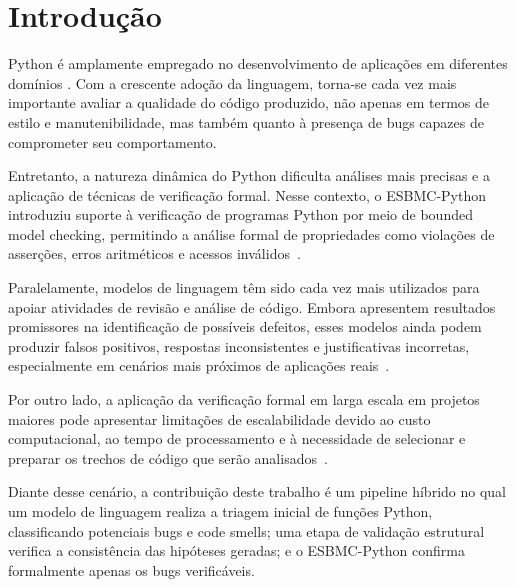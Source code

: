 \documentclass[sigconf]{acmart}
\begin{document}

\frenchspacing
\maketitle

\section{Introdução}

Python é amplamente empregado no desenvolvimento de aplicações em diferentes domínios \cite{tiobe2026}. Com a crescente adoção da linguagem, torna-se cada vez mais importante avaliar a qualidade do código produzido, não apenas em termos de estilo e manutenibilidade, mas também quanto à presença de bugs capazes de comprometer seu comportamento.

Entretanto, a natureza dinâmica do Python dificulta análises mais precisas e a aplicação de técnicas de verificação formal. Nesse contexto, o ESBMC-Python introduziu suporte à verificação de programas Python por meio de bounded model checking, permitindo a análise formal de propriedades como violações de asserções, erros aritméticos e acessos inválidos~\cite{farias2024esbmcpython}.

Paralelamente, modelos de linguagem têm sido cada vez mais utilizados para apoiar atividades de revisão e análise de código. Embora apresentem resultados promissores na identificação de possíveis defeitos, esses modelos ainda podem produzir falsos positivos, respostas inconsistentes e justificativas incorretas, especialmente em cenários mais próximos de aplicações reais~\cite{ullah2024secllmholmes,ding2025primevul}.

Por outro lado, a aplicação da verificação formal em larga escala em projetos maiores pode apresentar limitações de escalabilidade devido ao custo computacional, ao tempo de processamento e à necessidade de selecionar e preparar os trechos de código que serão analisados~\cite{shivaji2026eva}.

Diante desse cenário, a contribuição deste trabalho é um pipeline híbrido no qual um modelo de linguagem realiza a triagem inicial de funções Python, classificando potenciais bugs e code smells; uma etapa de validação estrutural verifica a consistência das hipóteses geradas; e o ESBMC-Python confirma formalmente apenas os bugs verificáveis.
\end{document}
